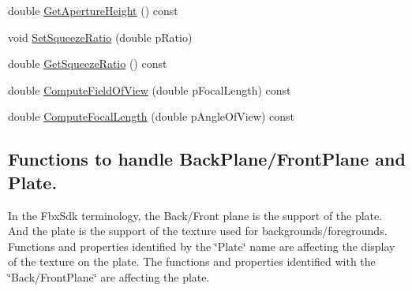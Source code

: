 \begin{DoxyCompactItemize}
\item 
double \hyperlink{class_fbx_camera_a652045fde3804f8a66b696030e40f662}{Get\+Aperture\+Height} () const
\item 
void \hyperlink{class_fbx_camera_a4ef18832cc863f5dcc086d0d10686122}{Set\+Squeeze\+Ratio} (double p\+Ratio)
\item 
double \hyperlink{class_fbx_camera_ac9e1f4cc33e3c927932c577d95c6cd93}{Get\+Squeeze\+Ratio} () const
\item 
double \hyperlink{class_fbx_camera_ac4549addd7a3f9dc62843b9208a52d81}{Compute\+Field\+Of\+View} (double p\+Focal\+Length) const
\item 
double \hyperlink{class_fbx_camera_aeb7c4720e64f1c247a0089943f521dc6}{Compute\+Focal\+Length} (double p\+Angle\+Of\+View) const
\end{DoxyCompactItemize}
\subsection*{Functions to handle Back\+Plane/\+Front\+Plane and Plate.}
\label{_amgrpaf57f84153af25ebbd4d47001d65f1eb}%
In the Fbx\+Sdk terminology, the Back/\+Front plane is the support of the plate. And the plate is the support of the texture used for backgrounds/foregrounds. Functions and properties identified by the \char`\"{}\+Plate\char`\"{} name are affecting the display of the texture on the plate. The functions and properties identified with the \char`\"{}\+Back/\+Front\+Plane\char`\"{} are affecting the plate.

